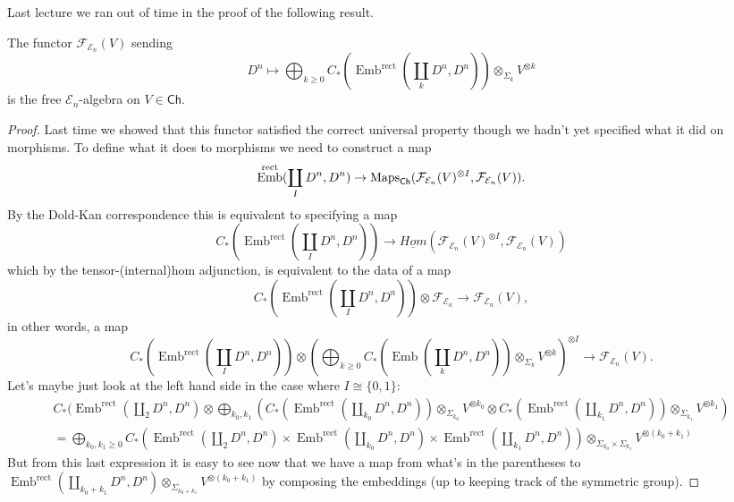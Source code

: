 \documentclass{amsart}
\DeclareMathOperator{\Emb}{Emb}
\begin{document}
Last lecture we ran out of time in the proof of the following result.
\begin{proposition}
    The functor $\mathcal{F}_{\mathcal{E}_n}(V)$ sending 
    \begin{equation*}
        D^n \mapsto \bigoplus_{k\geqslant 0}C_*\left( \Emb^\text{rect}(\coprod_kD^n,D^n) \right)\otimes_{\Sigma_k}V^{\otimes k}
    \end{equation*}
    is the free $\mathcal{E}_n$-algebra on $V\in\mathsf{Ch}$.
\end{proposition}
\begin{proof}
    Last time we showed that this functor satisfied the correct universal property though
    we hadn't yet specified what it did on morphisms. To define what it does to morphisms
    we need to construct a map
    \begin{equation*}
        \Emb^\text{rect}(\coprod_I D^n, D^n)\to \Maps_\mathsf{Ch}(\mathcal{F}_{\mathcal{E}_n}(V)^{\otimes I}, \mathcal{F}_{\mathcal{E}_n}(V)).
    \end{equation*}
    By the Dold-Kan correspondence this is equivalent to specifying a map
    \begin{equation*}
        C_*(\Emb^\text{rect}(\coprod_I D^n, D^n)) \to \underline{Hom}(\mathcal{F}_{\mathcal{E}_n}(V)^{\otimes I}, \mathcal{F}_{\mathcal{E}_n}(V))
    \end{equation*}
    which by the tensor-(internal)hom adjunction, is equivalent to the data of a map
    \begin{equation*}
        C_*(\Emb^\text{rect}(\coprod_I D^n, D^n)) \otimes \mathcal{F}_{\mathcal{E}_n} \to \mathcal{F}_{\mathcal{E}_n}(V),
    \end{equation*}
    in other words, a map
    \begin{equation*}
        C_*(\Emb^\text{rect}(\coprod_I D^n, D^n)) \otimes \left( \bigoplus_{k\geqslant 0}C_*(\Emb(\coprod_k D^n,D^n))\otimes_{\Sigma_k}V^{\otimes k} \right)^{\otimes I} \to \mathcal{F}_{\mathcal{E}_n}(V).
    \end{equation*}
    Let's maybe just look at the left hand side in the case where $I\cong\{0,1\}$:
    \begin{align*}
        C_*(\Emb^\text{rect}(\coprod_2 D^n, D^n)\otimes \bigoplus_{k_0,k_1}\left( C_*(\Emb^\text{rect}(\coprod_{k_0}D^n, D^n))\otimes_{\Sigma_{k_0}}V^{\otimes k_0}
        \otimes C_*(\Emb^\text{rect}(\coprod_{k_1}D^n, D^n))\otimes_{\Sigma_{k_1}} V^{\otimes k_1}\right) \\
        = \bigoplus_{k_0,k_1\geq 0} C_*\left( \Emb^\text{rect}(\coprod_2D^n,D^n)\times \Emb^\text{rect}(\coprod_{k_0}D^n,D^n)\times \Emb^\text{rect}(\coprod_{k_1}D^n,D^n) \right)\otimes_{\Sigma_{k_0}\times \Sigma_{k_1}} V^{\otimes(k_0+k_1)}
    \end{align*}
    But from this last expression it is easy to see now that we have a map 
    from what's in the parentheses to
    $\Emb^\text{rect}(\coprod_{k_0+k_1} D^n, D^n)\otimes_{\Sigma_{k_0+k_1}} V^{\otimes(k_0+k_1)}$
    by composing the embeddings (up to keeping track of the symmetric group).
\end{proof}
\end{document}

